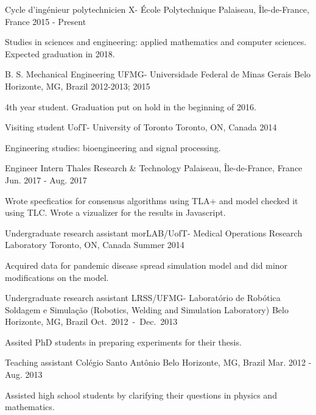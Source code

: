 \documentclass[11pt, a4paper]{awesome-cv}
\begin{document}
\makecvheader
%
%
\begin{cventries}
	\cventry
	{Cycle d'ingénieur polytechnicien}
	{X- École Polytechnique}
	{Palaiseau, Île-de-France, France}
	{2015 - Present}
	{
		\begin{cvitems}
			\item{Studies in sciences and engineering: applied mathematics and computer sciences. Expected graduation in 2018.}
		\end{cvitems}
	}
	\cventry
	{B. S. Mechanical Engineering}
	{UFMG- Universidade Federal de Minas Gerais}
	{Belo Horizonte, MG, Brazil}
	{2012-2013; 2015}
	{
		\begin{cvitems}
			\item {4th year student. Graduation put on hold in the beginning of 2016.}
		\end{cvitems}
	}
	\cventry
	{Visiting student}
	{UofT- University of Toronto}
	{Toronto, ON, Canada}
	{2014}
	{
		\begin{cvitems}
			\item{Engineering studies: bioengineering and signal processing.}
		\end{cvitems}
	}
\end{cventries}
%
\begin{cventries}
		\cventry
	{Engineer Intern}
	{Thales Research \& Technology}
	{Palaiseau, Île-de-France, France}
	{Jun. 2017 - Aug. 2017}
	{
		\begin{cvitems}
			\item {Wrote specficatios for consensus algorithms using TLA+ and model checked it using TLC. Wrote a vizualizer for the results in Javascript.}
		\end{cvitems}
	}

	\cventry
	{Undergraduate research assistant}
	{morLAB/UofT- Medical Operations Research Laboratory}
	{Toronto, ON, Canada}
	{Summer 2014}
	{
		\begin{cvitems}
			\item {Acquired data for pandemic disease spread simulation model and did minor modifications on the model.}
		\end{cvitems}
	}
	\cventry
	{Undergraduate research assistant}
	{LRSS/UFMG- Laboratório de Robótica Soldagem e Simulação (Robotics,	Welding and Simulation Laboratory)}
	{Belo Horizonte, MG, Brazil \mbox{Oct. 2012 - Dec. 2013}}
	{}
	{
		\begin{cvitems}
			\item {Assited PhD students in preparing experiments for their thesis.}
		\end{cvitems}
	}
	\cventry
	{Teaching assistant}
	{Colégio Santo Antônio}
	{Belo Horizonte, MG, Brazil}
	{Mar. 2012 - Aug. 2013}
	{
		\begin{cvitems}
			\item {Assisted high school students by clarifying their questions in physics and mathematics.}
		\end{cvitems}
	}
\end{cventries}
\end{document}
